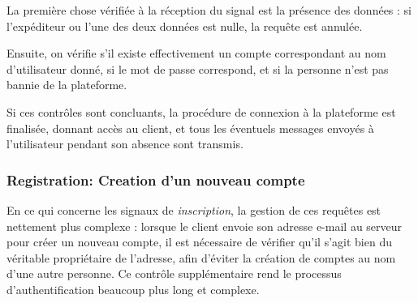 \documentclass{article}
\begin{document}
La première chose vérifiée à la réception du signal est la présence des données : si l’expéditeur ou l’une des deux données est nulle, la requête est annulée.

Ensuite, on vérifie s’il existe effectivement un compte correspondant au nom d’utilisateur donné, si le mot de passe correspond, et si la personne n’est pas bannie de la plateforme.

Si ces contrôles sont concluants, la procédure de connexion à la plateforme est finalisée, donnant accès au client, et tous les éventuels messages envoyés à l’utilisateur pendant son absence sont transmis.

\subsubsection{Registration: Creation d'un nouveau compte}

En ce qui concerne les signaux de \textit{inscription}, la gestion de ces requêtes est nettement plus complexe : lorsque le client envoie son adresse e-mail au serveur pour créer un nouveau compte, il est nécessaire de vérifier qu’il s’agit bien du véritable propriétaire de l’adresse, afin d’éviter la création de comptes au nom d’une autre personne. Ce contrôle supplémentaire rend le processus d’authentification beaucoup plus long et complexe.
\end{document}
